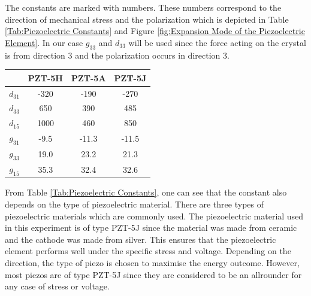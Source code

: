 \begin{minipage}{0.66\textwidth}
    The constants are marked with numbers. These numbers correspond to the direction of mechanical stress and the polarization which is depicted in Table \ref{Tab:Piezoelectric Constants} and Figure \ref{fig:Expansion Mode of the Piezoelectric Element}. In our case $g_{33}$ and $d_{33}$ will be used since the force acting on the crystal is from direction 3 and the polarization occurs in direction 3.\cite{F3lixTutorial2023}\\ 
\end{minipage}
\begin{minipage}{0.5\textwidth}
    \center
        \begin{tabular}{|c|c|c|c|}
            \hline
            & PZT-5H & PZT-5A & PZT-5J \\
            \hline
            \hline
            $d_{31}$ & -320 & -190 & -270 \\
            \hline
            $d_{33}$ & 650 & 390 & 485 \\
            \hline
            $d_{15}$ & 1000 & 460 & 850 \\
            \hline
            $g_{31}$ & -9.5 & -11.3 & -11.5 \\
            \hline
            $g_{33}$ & 19.0 & 23.2 & 21.3 \\
            \hline
            $g_{15}$ & 35.3 & 32.4 & 32.6 \\
            \hline
        \end{tabular}
        \label{Tab:Piezoelectric Constants}
\end{minipage}
\begin{minipage}{0.5\textwidth}
    From Table \ref{Tab:Piezoelectric Constants}, one can see that the constant also depends on the type of piezoelectric material. There are three types of piezoelectric materials which are commonly used. The piezoelectric material used in this experiment is of type PZT-5J since the material was made from ceramic and the cathode was made from silver. This ensures that the piezoelectric element performs well under the specific stress and voltage. Depending on the direction, the type of piezo is chosen to maximise the energy outcome. However, most piezos are of type PZT-5J since they are considered to be an allrounder for any case of stress or voltage. \cite{Carter2023}\\
\end{minipage}
